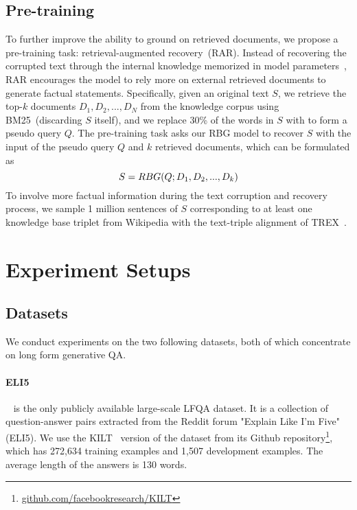 \documentclass[11pt]{article}
\def\mask{{\sc[mask]}}
\begin{document}
\vspace{-12pt}
\subsection{Pre-training}
\vspace{-5pt}
To further improve the ability to ground on retrieved documents, we propose a pre-training task: retrieval-augmented recovery~(RAR). Instead of recovering the corrupted text through the internal knowledge memorized in model parameters~\cite{raffel2020exploring,lewis2020bart}, RAR encourages the model to rely more on external retrieved documents to generate factual statements. Specifically, given an original text $S$, we retrieve the top-$k$ documents ${D_1,D_2,...,D_N}$ from the knowledge corpus using BM25~(discarding $S$ itself), and we replace 30\% of the words in $S$ with \mask to form a pseudo query $Q$. The pre-training task asks our RBG model to recover $S$ with the input of the pseudo query $Q$ and $k$ retrieved documents, which can be formulated as
\vspace{-5pt}
\begin{equation}
S=RBG(Q;D_1,D_2,...,D_k)
    \vspace{-5pt}
\end{equation}
\noindent To involve more factual information during the text corruption and recovery process, we sample 1 million sentences of $S$ corresponding to at least one knowledge base triplet from Wikipedia with the text-triple alignment of TREX~\cite{TREX}.  


\vspace{-10pt}
\section{Experiment Setups}
\vspace{-5pt}

\subsection{Datasets}
We conduct experiments on the two following datasets, both of which concentrate on long form generative QA.
\vspace{-5pt}
\paragraph{ELI5}~\cite{fan2019eli5} is the only publicly available large-scale LFQA dataset. It is a collection of
question-answer pairs extracted from the Reddit forum "Explain Like
I’m Five"(ELI5). We use the KILT~\cite{petroni2021kilt}  version of the dataset from its Github repository\footnote{\url{github.com/facebookresearch/KILT}}, which
has 272,634 training examples and 1,507 development examples. The average length of the answers is 130 words.
\vspace{-5pt}
\end{document}
